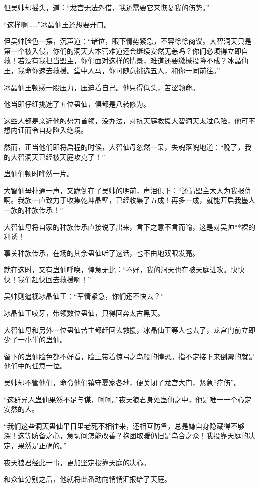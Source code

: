 \begin{this_body}
但吴帅却摇头，道：“龙宫无法外借，我还需要它来恢复我的伤势。”

“这样啊……”冰晶仙王还想要开口。

但吴帅脸色一摆，沉声道：“诸位，眼下情势紧急，不容徐徐商议。大智洞天只是第一个被入侵，你们的洞天大本营难道还会继续安然无恙吗？你们必须得立即自救！若没有我担当盟主，你们面对这样的情景，难道还要缴械投降不成？冰晶仙王，我命你速去救援。堂中人马，你可随意挑选五人，和你一同前往。”

冰晶仙王顿感一股压力，压迫着自己。他只得低头，苦涩领命。

他当即仔细挑选了五位蛊仙，俱都是八转修为。

这些人都是亲近他的势力首领，没办法，对抗天庭救援大智洞天太过危险，他可不想内讧而令自身陷入绝境。

然而，正当他们即将启程的时候，大智仙母忽然一呆，失魂落魄地道：“晚了，我的大智洞天已经被天庭攻克了！”

蛊仙们顿时哗然一片。

大智仙母扑通一声，又跪倒在了吴帅的明前，声泪俱下：“还请盟主大人为我报仇啊。我族一直致力于收集乾坤晶壁，已经收集了五成！再多一成，就能开启我墨人一族的种族传承！”

大智仙母将自家的种族传承直接说了出来，言下之意不言而喻，这是对吴帅**裸的利诱！

事关种族传承，在场的其余蛊仙听了这话，也不由地双眼发亮。

就在这时，又有蛊仙呼唤，惶急无比：“不好，我的洞天也在被天庭进攻。快快快！我们赶快回去救援啊！”

吴帅则逼视冰晶仙王：“军情紧急，你们还不快去？”

冰晶仙王咬牙，带领数位蛊仙，只得回奔太古黑天。

大智仙母和另外一位蛊仙苦主都赶回去救援，冰晶仙王等人也去了，龙宫门前立即少了一小半的蛊仙。

留下的蛊仙脸色都不好看，脸上带着惊弓之鸟般的惶恐。指不定接下来倒霉的就是他们中的任意一位。

吴帅却不管他们，命令他们镇守夏家各地，便关闭了龙宫大门，紧急“疗伤”。

“这群异人蛊仙果然不足与谋，呵呵。”夜天狼君身处蛊仙之中，他是唯一一个心定安然的人。

“我们这些洞天蛊仙平日里老死不相往来，还相互防备，总是嫌自身隐藏得不够深！这等防备之心，急切间怎能改善？抱团取暖仍旧是乌合之众！我投靠天庭的决定，果然是正确的。”

夜天狼君经此一事，更加坚定投靠天庭的决心。

和众仙分别之后，他就将此番动向悄悄汇报给了天庭。


\end{this_body}
